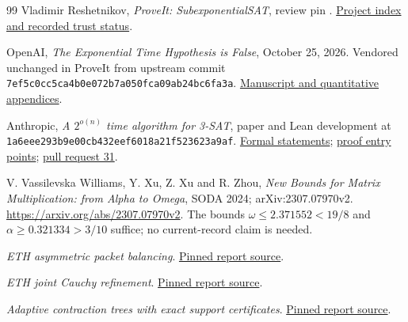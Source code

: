 \begin{thebibliography}{99}\small
{}
Vladimir Reshetnikov, \emph{ProveIt: SubexponentialSAT}, review pin
\pin.
\href{https://github.com/VladimirReshetnikov/ProveIt/blob/324f3d9b009ab0323f33be65cd6577867c9c4338/Computability/SubexponentialSAT/README.md}{Project index and recorded trust status}.

OpenAI, \emph{The Exponential Time Hypothesis is False}, October 25, 2026.
Vendored unchanged in ProveIt from upstream commit
\texttt{7ef5c0cc5ca4b0e072b7a050fca09ab24bc6fa3a}.
\href{https://github.com/VladimirReshetnikov/ProveIt/tree/7de9d09fecd17de776d712835ecb2011205c531d/lib/openai-math/preprints/The-Exponential-Time-Hypothesis-is-False-October-25-2026}{Manuscript and quantitative appendices}.

Anthropic, \emph{A $2^{o(n)}$ time algorithm for 3-SAT}, paper and Lean
development at
\texttt{1a6eee293b9e00cb432eef6018a21f523623a9af}.
\href{https://github.com/anthropics/formal-math/blob/1a6eee293b9e00cb432eef6018a21f523623a9af/eth/MainResults.lean}{Formal statements};
\href{https://github.com/anthropics/formal-math/blob/1a6eee293b9e00cb432eef6018a21f523623a9af/eth/Solution.lean}{proof entry points};
\href{https://github.com/anthropics/formal-math/pull/31}{pull request 31}.

V. Vassilevska Williams, Y. Xu, Z. Xu and R. Zhou,
\emph{New Bounds for Matrix Multiplication: from Alpha to Omega},
SODA 2024; arXiv:2307.07970v2.
\url{https://arxiv.org/abs/2307.07970v2}.
The bounds $\omega\le2.371552<19/8$ and
$\alpha\ge0.321334>3/10$ suffice; no current-record claim is needed.

\emph{ETH asymmetric packet balancing}.
\href{https://github.com/VladimirReshetnikov/ProveIt/blob/7de9d09fecd17de776d712835ecb2011205c531d/Computability/SubexponentialSAT/Research/eth_asymmetric_packet_balancing/report.tex}{Pinned report source}.

\emph{ETH joint Cauchy refinement}.
\href{https://github.com/VladimirReshetnikov/ProveIt/blob/7de9d09fecd17de776d712835ecb2011205c531d/Computability/SubexponentialSAT/Research/eth_joint_cauchy/report.tex}{Pinned report source}.

\emph{Adaptive contraction trees with exact support certificates}.
\href{https://github.com/VladimirReshetnikov/ProveIt/blob/7de9d09fecd17de776d712835ecb2011205c531d/Computability/SubexponentialSAT/Research/sat_adaptive_tree_certificate/report.tex}{Pinned report source}.


\end{thebibliography}
